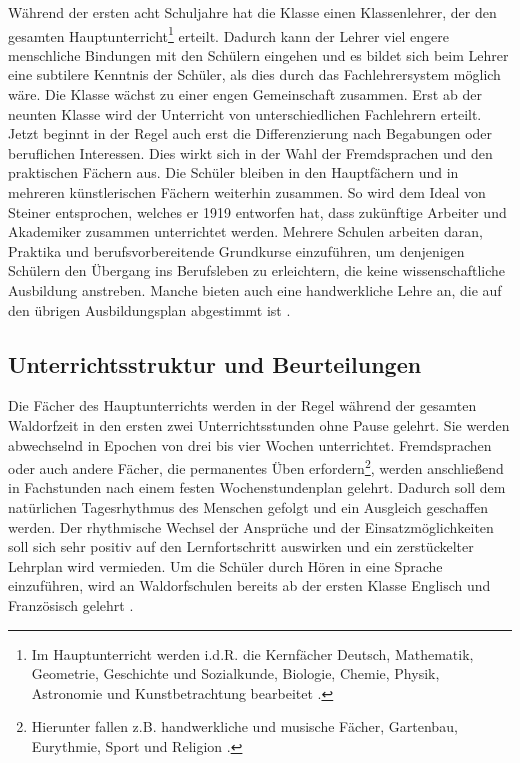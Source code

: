 Während der ersten acht Schuljahre hat die Klasse einen Klassenlehrer, der den gesamten Hauptunterricht\footnote{Im Hauptunterricht werden i.d.R. die Kernfächer Deutsch, Mathematik, Geometrie, Geschichte und Sozialkunde, Biologie, Chemie, Physik, Astronomie und Kunstbetrachtung bearbeitet \citep[vgl.][S. 50]{kiersch07}.} erteilt. Dadurch kann der Lehrer viel engere menschliche Bindungen mit den Schülern eingehen und es bildet sich beim Lehrer eine subtilere Kenntnis der Schüler, als dies durch das Fachlehrersystem möglich wäre. Die Klasse wächst zu einer engen Gemeinschaft zusammen. Erst ab der neunten Klasse wird der Unterricht von unterschiedlichen Fachlehrern erteilt. Jetzt beginnt in der Regel auch erst die Differenzierung nach Begabungen oder beruflichen Interessen. Dies wirkt sich in der Wahl der Fremdsprachen und den praktischen Fächern aus. Die Schüler bleiben in den Hauptfächern und in mehreren künstlerischen Fächern weiterhin zusammen. So wird dem Ideal von Steiner entsprochen, welches er 1919 entworfen hat, dass zukünftige Arbeiter und Akademiker zusammen unterrichtet werden. Mehrere Schulen arbeiten daran, Praktika und berufsvorbereitende Grundkurse einzuführen, um denjenigen Schülern den Übergang ins Berufsleben zu erleichtern, die keine wissenschaftliche Ausbildung anstreben. Manche bieten auch eine handwerkliche Lehre an, die auf den übrigen Ausbildungsplan abgestimmt ist \citep[vgl.][]{kiersch07, hemleben63}.

\subsection{Unterrichtsstruktur und Beurteilungen} %
\label{sub:unterrichtsstruktur_und_Beurteilungen}
Die Fächer des Hauptunterrichts werden in der Regel während der gesamten Waldorfzeit in den ersten zwei Unterrichtsstunden ohne Pause gelehrt. Sie werden abwechselnd in Epochen von drei bis vier Wochen unterrichtet. Fremdsprachen oder auch andere Fächer, die permanentes Üben erfordern\footnote{Hierunter fallen z.B. handwerkliche und musische Fächer, Gartenbau, Eurythmie, Sport und Religion \citep[vgl.][]{waldorfschule13}.}, werden anschließend in Fachstunden nach einem festen Wochenstundenplan gelehrt. Dadurch soll dem natürlichen Tagesrhythmus des Menschen gefolgt und ein Ausgleich geschaffen werden. Der rhythmische Wechsel der Ansprüche und der Einsatzmöglichkeiten soll sich sehr positiv auf den Lernfortschritt auswirken und ein zerstückelter Lehrplan wird vermieden. Um die Schüler durch Hören in eine Sprache einzuführen, wird an Waldorfschulen bereits ab der ersten Klasse Englisch und Französisch gelehrt \citep[vgl.][]{kiersch07, hemleben63}.

